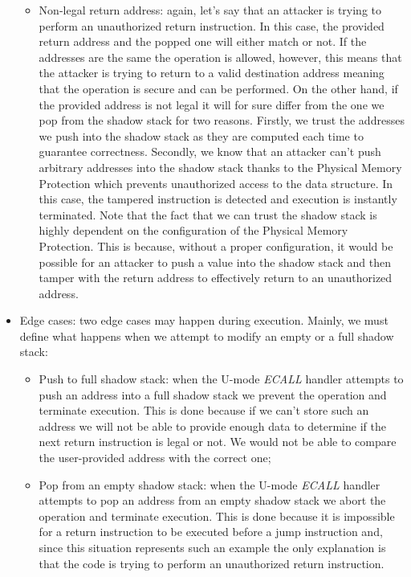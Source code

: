 \begin{itemize}
\begin{itemize}
      \item Non-legal return address: again, let's say that an attacker is trying
        to perform an unauthorized return instruction. In this case, the provided
        return address and the popped one will either match or not. If the
        addresses are the same the operation is allowed, however, this means
        that the attacker is trying to return to a valid destination address
        meaning that the operation is secure and can be performed. On the other hand,
        if the provided address is not legal it will for sure differ from the
        one we pop from the shadow stack for two reasons. Firstly, we trust the
        addresses we push into the shadow stack as they are computed each time
        to guarantee correctness. Secondly, we know that an attacker can't push
        arbitrary addresses into the shadow stack thanks to the Physical Memory
        Protection which prevents unauthorized access to the data structure. In this
        case, the tampered instruction is detected and execution is instantly
        terminated. Note that the fact that we can trust the shadow stack is highly
        dependent on the configuration of the Physical Memory Protection. This
        is because, without a proper configuration, it would be possible for an
        attacker to push a value into the shadow stack and then tamper with the
        return address to effectively return to an unauthorized address.
    \end{itemize}

  \item Edge cases: two edge cases may happen during execution. Mainly, we must
    define what happens when we attempt to modify an empty or a full shadow
    stack:
    \begin{itemize}
      \item Push to full shadow stack: when the U-mode \textit{ECALL} handler attempts
        to push an address into a full shadow stack we prevent the operation and
        terminate execution. This is done because if we can't store such an
        address we will not be able to provide enough data to determine if the
        next return instruction is legal or not. We would not be able to compare
        the user-provided address with the correct one;

      \item Pop from an empty shadow stack: when the U-mode \textit{ECALL} handler
        attempts to pop an address from an empty shadow stack we abort the operation
        and terminate execution. This is done because it is impossible for a
        return instruction to be executed before a jump instruction and, since this
        situation represents such an example the only explanation is that the code
        is trying to perform an unauthorized return instruction.
    \end{itemize}
\end{itemize}

